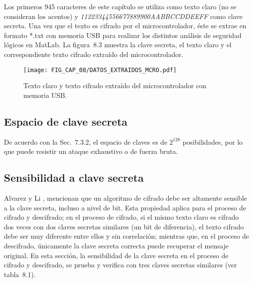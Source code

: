 Los primeros 945 caracteres de este capítulo se utiliza como texto claro (no se consideran los acentos) y \textit{11223344556677889900AABBCCDDEEFF} como clave secreta. Una vez que el texto es cifrado por el microcontrolador, éste se extrae en formato *.txt con memoria USB para realizar los distintos análisis de seguridad lógicos en MatLab. La figura~8.3 muestra la clave secreta, el texto claro y el correspondiente texto cifrado extraído del microcontrolador.

\begin{figure}[!htbp] %
	\center
	\texttt{[image: FIG\_CAP\_08/DATOS\_EXTRAIDOS\_MCRO.pdf]}     
	\caption{Texto claro y texto cifrado extraído del microcontrolador con memoria USB.}
\end{figure}

\subsection{Espacio de clave secreta}
De acuerdo con la Sec.~7.3.2, el espacio de claves es de $2^{128}$ posibilidades, por lo que puede resistir un ataque exhaustivo o de fuerza bruta.

\subsection{Sensibilidad a clave secreta}
Alvarez y Li \cite{AyL_2006}, mencionan que un algoritmo de cifrado debe ser altamente sensible a la clave secreta, incluso a nivel de bit. Esta propiedad aplica para el proceso de cifrado y descifrado; en el proceso de cifrado, si el mismo texto claro es cifrado dos veces con dos claves secretas similares (un bit de diferencia), el texto cifrado debe ser muy diferente entre ellos y sin correlación; mientras que, en el proceso de descifrado, únicamente la clave secreta correcta puede recuperar el mensaje original. En esta sección, la sensibilidad de la clave secreta en el proceso de cifrado y descifrado, se prueba y verifica con tres claves secretas similares (ver tabla~8.1). \\


